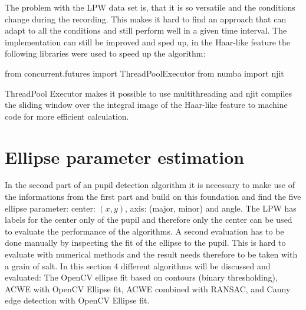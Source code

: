 The problem with the LPW data set is, that it is so versatile and the conditions change during the recording. This makes it hard to find an approach that can adapt to all the conditions and still perform well in a given time interval. The implementation can still be improved and sped up, in the Haar-like feature the following libraries were used to speed up the algorithm: 

\begin{python}
from concurrent.futures import ThreadPoolExecutor
from numba import njit
    \end{python}
ThreadPool Executor makes it possible to use multithreading and njit compiles the sliding window over the integral image of the Haar-like feature to machine code for more efficient calculation.

\section{Ellipse parameter estimation}
In the second part of an pupil detection algorithm it is necessary to make use of the informations from the first part and build on this foundation and find the five ellipse parameter: center: $(x,y)$, axis: (major, minor) and angle. The LPW has labels for the center only of the pupil and therefore only the center can be used to evaluate the performance of the algorithms. A second evaluation has to be done manually by inspecting the fit of the ellipse to the pupil. This is hard to evaluate with numerical methods and the result needs therefore to be taken with a grain of salt. In this section 4 different algorithms will be discussed and evaluated: The OpenCV ellipse fit based on contours (binary thresholding), ACWE with OpenCV Ellipse fit, ACWE combined with RANSAC, and Canny edge detection with OpenCV Ellipse fit. 

